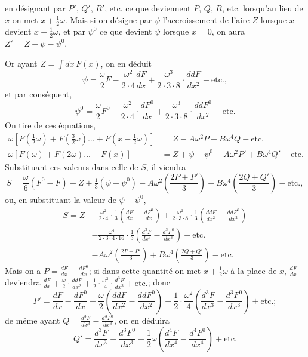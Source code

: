 \documentclass{article}
\begin{document}
en désignant par $P'$, $Q'$, $R'$, etc. ce que deviennent $P$, $Q$, $R$, etc. lorsqu'au lieu de $x$ on met $x+\frac{1}{2}\omega$. Mais si on désigne par $\psi$ l'accroissement de l'aire $Z$ lorsque $x$ devient $x+\frac{1}{2}\omega$, et par $\psi^{0}$ ce que devient $\psi$ lorsque $x=0$, on aura $Z'=Z+\psi-\psi^{0}$.

Or ayant $Z=\displaystyle\int dx\,F(x)$, on en déduit
\[ \psi=\frac{\omega}{2}F-\frac{\omega^{2}}{2\cdot4}\frac{dF}{dx}+\frac{\omega^{3}}{2\cdot3\cdot8}\cdot\frac{ddF}{dx^{2}}-\text{etc.}, \]
et par conséquent,
\[ \psi^{0}=\frac{\omega}{2}F^{0}-\frac{\omega^{2}}{2\cdot4}\cdot\frac{dF^{0}}{dx}+\frac{\omega^{3}}{2\cdot3\cdot8}\cdot\frac{ddF^{0}}{dx^{2}}-\text{etc.} \]
On tire de ces équations,
\[ \begin{aligned} \omega[F(\tfrac{1}{2}\omega)+F(\tfrac{3}{2}\omega)\ldots+F(x-\tfrac{1}{2}\omega)]&=Z-A\omega^{2}P+B\omega^{4}Q-\text{etc.}\\ \omega[F(\omega)+F(2\omega)\ldots+F(x)]&=Z+\psi-\psi^{0}-A\omega^{2}P'+B\omega^{4}Q'-\text{etc.} \end{aligned} \]
Substituant ces valeurs dans celle de $S$, il viendra
\[ S=\frac{\omega}{6}(F^{0}-F)+Z+\tfrac{1}{3}(\psi-\psi^{0})-A\omega^{2}\left(\frac{2P+P'}{3}\right)+B\omega^{4}\left(\frac{2Q+Q'}{3}\right)-\text{etc.}, \]
ou, en substituant la valeur de $\psi-\psi^{0}$,
\[ \begin{aligned} S=Z&-\frac{\omega^{2}}{2\cdot4}\cdot\frac{1}{3}\left(\frac{dF}{dx}-\frac{dF^{0}}{dx}\right)+\frac{\omega^{2}}{2\cdot3\cdot8}\cdot\frac{1}{3}\left(\frac{ddF}{dx^{2}}-\frac{ddF^{0}}{dx^{2}}\right)\\ &-\frac{\omega^{4}}{2\cdot3\cdot4\cdot16}\cdot\frac{1}{3}\left(\frac{d^{3}F}{dx^{3}}-\frac{d^{3}F^{0}}{dx^{3}}\right)+\text{etc.}\\ &-A\omega^{2}\left(\frac{2P+P'}{3}\right)+B\omega^{4}\left(\frac{2Q+Q'}{3}\right)-\text{etc.} \end{aligned} \]
Mais on a $P=\frac{dF}{dx}-\frac{dF^{0}}{dx}$; si dans cette quantité on met $x+\frac{1}{2}\omega$ à la place de $x$, $\frac{dF}{dx}$ deviendra $\frac{dF}{dx}+\frac{\omega}{2}\cdot\frac{ddF}{dx^{2}}+\frac{1}{2}\cdot\frac{\omega^{2}}{4}\cdot\frac{d^{3}F}{dx^{3}}+\text{etc.}$; donc
\[ P'=\frac{dF}{dx}-\frac{dF^{0}}{dx}+\frac{\omega}{2}\left(\frac{ddF}{dx^{2}}-\frac{ddF^{0}}{dx^{2}}\right)+\frac{1}{2}\cdot\frac{\omega^{2}}{4}\left(\frac{d^{3}F}{dx^{3}}-\frac{d^{3}F^{0}}{dx^{3}}\right)+\text{etc.}; \]
de même ayant $Q=\frac{d^{3}F}{dx^{3}}-\frac{d^{3}F^{0}}{dx^{3}}$, on en déduira
\[ Q'=\frac{d^{3}F}{dx^{3}}-\frac{d^{3}F^{0}}{dx^{3}}+\frac{1}{2}\omega\left(\frac{d^{4}F}{dx^{4}}-\frac{d^{4}F^{0}}{dx^{4}}\right)+\text{etc.} \]
\end{document}
